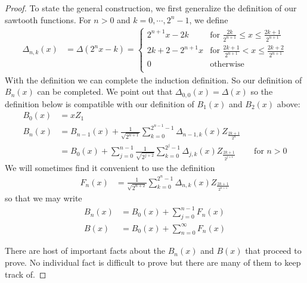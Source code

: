 \begin{proof}
To state the general construction, we first generalize the definition
of our sawtooth functions.  For $n > 0$ and $k=0, \cdots, 2^n -1$, we
define 
\begin{align*}
\Delta_{n,k} (x) &= \Delta(2^nx- k) = \begin{cases}
2^{n+1}x -2k & \text{for $\frac{2k}{2^{n+1}} \leq x \leq \frac{2k+1}{2^{n+1}}$} \\
2k + 2 - 2^{n+1}x & \text{for $\frac{2k+1}{2^{n+1}} < x \leq \frac{2k+2}{2^{n+1}}$} \\
0 & \text{otherwise} \\
\end{cases}
\end{align*}
With the definition we can complete the induction definition.  So our definition
of $B_n(x)$ can be completed.  We point out that $\Delta_{0,0}(x) =
\Delta(x)$ so the definition below is compatible with our definition
of $B_1(x)$ and $B_2(x)$ above:
\begin{align*} 
B_0(x) &= x Z_1 \\
B_n(x) &= B_{n-1}(x) + \frac{1}{\sqrt{2^{n+1}}} \sum_{k=0}^{2^{n-1} -1}
\Delta_{n-1,k}(x) Z_{\frac{2k+1}{2^{n}}} \\
&=B_0(x) + \sum_{j=0}^{n-1}\frac{1}{\sqrt{2^{j+2}}} \sum_{k=0}^{2^j -1}
\Delta_{j,k}(x) Z_{\frac{2k+1}{2^{j+1}}} & & \text{for $n > 0$} 
\end{align*}
We will sometimes find it convenient to use the definition
\begin{align*}
F_n(x) &= \frac{1}{\sqrt{2^{n+2}}} \sum_{k=0}^{2^n -1}
\Delta_{n,k}(x) Z_{\frac{2k+1}{2^{n+1}}} 
\end{align*}
so that we may write 
\begin{align*}
B_n(x) &= B_0(x) + \sum_{j=0}^{n-1} F_n(x) \\
B(x) &= B_0(x) + \sum_{n=0}^\infty F_n(x)
\end{align*}

There are host of important facts about the $B_n(x)$ and $B(x)$ that
proceed to prove.  No individual fact is difficult to prove but there
are many of them to keep track of.


\end{proof}

